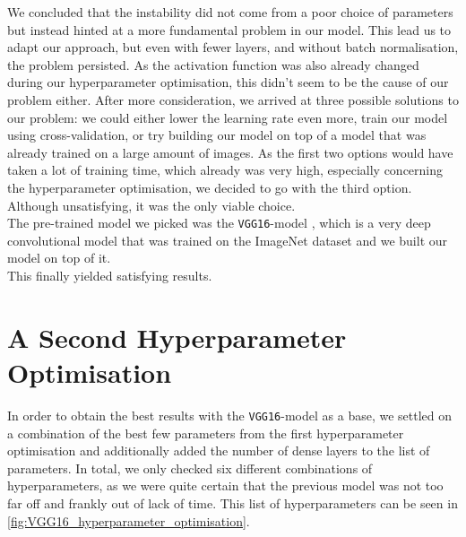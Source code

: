We concluded that the instability did not come from a poor choice of parameters but instead hinted at a more fundamental problem in our model.
This lead us to adapt our approach, but even with fewer layers, and without batch normalisation, the problem persisted.
As the activation function was also already changed during our hyperparameter optimisation, this didn't seem to be the cause of our problem either.
After more consideration, we arrived at three possible solutions to our problem: we could either lower the learning rate even more, train our model using cross-validation,
or try building our model on top of a model that was already trained on a large amount of images.
As the first two options would have taken a lot of training time, which already was very high, especially concerning the hyperparameter optimisation,
we decided to go with the third option.
Although unsatisfying, it was the only viable choice. \\

The pre-trained model we picked was the \texttt{VGG16}-model \cite{VGG16source}, which is a very deep convolutional model that was trained on the ImageNet dataset
and we built our model on top of it. \\

This finally yielded satisfying results.


\section{A Second Hyperparameter Optimisation}

In order to obtain the best results with the \texttt{VGG16}-model as a base, we settled on a combination of the best few parameters from the first hyperparameter optimisation
and additionally added the number of dense layers to the list of parameters.
In total, we only checked six different combinations of hyperparameters, as we were quite certain that the previous model was not too far off and frankly out of lack of time.
This list of hyperparameters can be seen in \autoref{fig:VGG16_hyperparameter_optimisation}.

